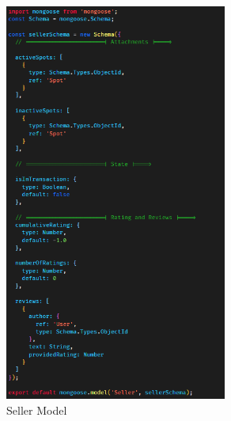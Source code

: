                     \begin{figure}[h]
                        \centering
                        \includegraphics[width=0.65\textwidth]{images/sellerModel.png}
                        \caption{Seller Model}
                        \label{fig:sellerModel}
                    \end{figure}


